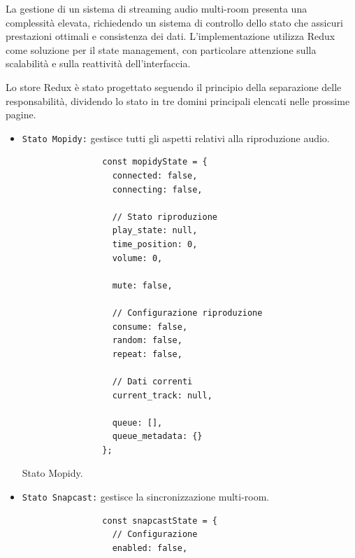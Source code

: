 La gestione di un sistema di streaming audio multi-room presenta una complessità elevata, richiedendo un sistema di controllo dello stato che assicuri prestazioni ottimali e consistenza dei dati. L'implementazione utilizza Redux come soluzione per il state management, con particolare attenzione sulla scalabilità e sulla reattività dell'interfaccia.

Lo store Redux è stato progettato seguendo il principio della separazione delle responsabilità, dividendo lo stato in tre domini principali elencati nelle prossime pagine.

\newpage
\begin{itemize}
    \item \texttt{Stato Mopidy:} gestisce tutti gli aspetti relativi alla riproduzione audio.

          \begin{table}[H]
            \begin{algorithm}[H]
              \caption{}
              \BlankLine
              \begin{verbatim}
                const mopidyState = {
                  connected: false,
                  connecting: false,
          
                  // Stato riproduzione
                  play_state: null,
                  time_position: 0,
                  volume: 0,
          
                  mute: false,
          
                  // Configurazione riproduzione
                  consume: false,
                  random: false,
                  repeat: false,
          
                  // Dati correnti
                  current_track: null,
          
                  queue: [],
                  queue_metadata: {}
                };
              \end{verbatim}
            \end{algorithm}
            \caption{Stato Mopidy.}
            \label{tab:stato_mopidy}
          \end{table}
          \newpage
    \item \texttt{Stato Snapcast:} gestisce la sincronizzazione multi-room.

          \begin{table}[H]
            \begin{algorithm}[H]
              \caption{}
              \BlankLine              
              \begin{verbatim}
                const snapcastState = {
                  // Configurazione
                  enabled: false,
          

\end{verbatim}
\end{algorithm}
\end{table}
\end{itemize}
